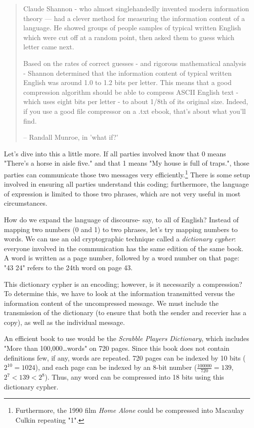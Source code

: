 \begin{quotation}
Claude Shannon - who almost singlehandedly invented modern information theory — had a clever method for measuring the information content of a language. He showed groups of people samples of typical written English which were cut off at a random point, then asked them to guess which letter came next.

Based on the rates of correct guesses - and rigorous mathematical analysis - Shannon determined that the information content of typical written English was around 1.0 to 1.2 bits per letter. This means that a good compression algorithm should be able to compress ASCII English text - which uses eight bits per letter - to about 1/8th of its original size. Indeed, if you use a good file compressor on a .txt ebook, that’s about what you'll find.

-- Randall Munroe, in 'what if?'\cite{xkcd-what-if-34}
\end{quotation}

Let's dive into this a little more. If all parties involved know that 0 means "There's a horse in aisle five." and that 1 means "My house is full of traps.", those parties can communicate those two messages very efficiently.\footnote{Furthermore, the 1990 film \textit{Home Alone} could be compressed into Macaulay Culkin repeating "1".} There is some setup involved in ensuring all parties understand this coding; furthermore, the language of expression is limited to those two phrases, which are not very useful in most circumstances.

How do we expand the language of discourse- say, to all of English? Instead of mapping two numbers (0 and 1) to two phrases, let's try mapping numbers to words. We can use an old cryptographic technique called a \textit{dictionary cypher}: everyone involved in the communication has the same edition of the same book. A word is written as a page number, followed by a word number on that page: "43 24" refers to the 24th word on page 43.

This dictionary cypher is an encoding; however, is it necessarily a compression? To determine this, we have to look at the information transmitted versus the information content of the uncompressed message. We must include the transmission of the dictionary (to ensure that both the sender and recevier has a copy), as well as the individual message.

An efficient book to use would be the \textit{Scrabble Players Dictionary}, which includes "More than 100,000\ldots words" on 720 pages. Since this book does not contain definitions few, if any, words are repeated. 
720 pages can be indexed by 10 bits ($2^{10}=1024$), and each page can be indexed by an 8-bit number ($\frac{100000}{720}=139$, $2^7 < 139 < 2^8$). Thus, any word can be compressed into 18 bits using this dictionary cypher.

